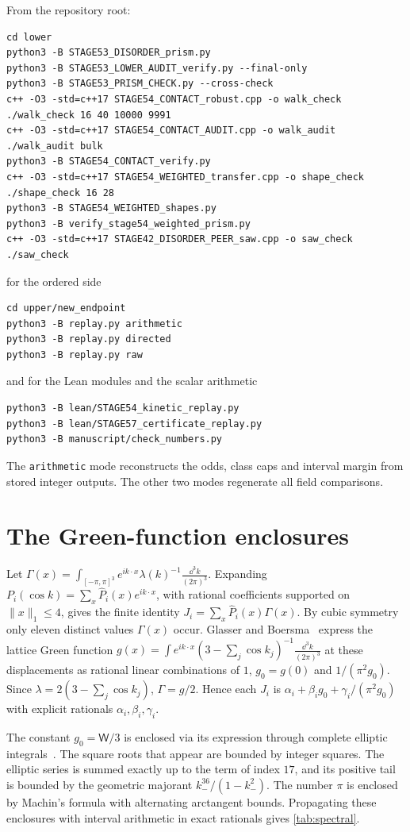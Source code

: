 From the repository root:
\begin{verbatim}
cd lower
python3 -B STAGE53_DISORDER_prism.py
python3 -B STAGE53_LOWER_AUDIT_verify.py --final-only
python3 -B STAGE53_PRISM_CHECK.py --cross-check
c++ -O3 -std=c++17 STAGE54_CONTACT_robust.cpp -o walk_check
./walk_check 16 40 10000 9991
c++ -O3 -std=c++17 STAGE54_CONTACT_AUDIT.cpp -o walk_audit
./walk_audit bulk
python3 -B STAGE54_CONTACT_verify.py
c++ -O3 -std=c++17 STAGE54_WEIGHTED_transfer.cpp -o shape_check
./shape_check 16 28
python3 -B STAGE54_WEIGHTED_shapes.py
python3 -B verify_stage54_weighted_prism.py
c++ -O3 -std=c++17 STAGE42_DISORDER_PEER_saw.cpp -o saw_check
./saw_check
\end{verbatim}
for the ordered side
\begin{verbatim}
cd upper/new_endpoint
python3 -B replay.py arithmetic
python3 -B replay.py directed
python3 -B replay.py raw
\end{verbatim}
and for the Lean modules and the scalar arithmetic
\begin{verbatim}
python3 -B lean/STAGE54_kinetic_replay.py
python3 -B lean/STAGE57_certificate_replay.py
python3 -B manuscript/check_numbers.py
\end{verbatim}
The \texttt{arithmetic} mode reconstructs the odds, class caps and interval margin from stored integer outputs. The other two modes regenerate all field comparisons.

\section{The Green-function enclosures}\label{app:green}

Let $\Gamma(x)=\int_{[-\pi,\pi]^3}e^{ik\cdot x}\lambda(k)^{-1}\frac{\dd^3k}{(2\pi)^3}$. Expanding $P_i(\cos k)=\sum_x\widehat P_i(x)e^{ik\cdot x}$, with rational coefficients supported on $\|x\|_1\le4$, gives the finite identity $J_i=\sum_x\widehat P_i(x)\Gamma(x)$. By cubic symmetry only eleven distinct values $\Gamma(x)$ occur. Glasser and Boersma~\cite[Table~1]{GB00} express the lattice Green function $g(x)=\int e^{ik\cdot x}(3-\sum_j\cos k_j)^{-1}\frac{\dd^3k}{(2\pi)^3}$ at these displacements as rational linear combinations of $1$, $g_0=g(0)$ and $1/(\pi^2g_0)$. Since $\lambda=2(3-\sum_j\cos k_j)$, $\Gamma=g/2$. Hence each $J_i$ is $\alpha_i+\beta_ig_0+\gamma_i/(\pi^2g_0)$ with explicit rationals $\alpha_i,\beta_i,\gamma_i$.

The constant $g_0=\mathsf W/3$ is enclosed via its expression through complete elliptic integrals~\cite{Wat39,GB00}. The square roots that appear are bounded by integer squares. The elliptic series is summed exactly up to the term of index $17$, and its positive tail is bounded by the geometric majorant $k_-^{36}/(1-k_-^2)$. The number $\pi$ is enclosed by Machin's formula with alternating arctangent bounds. Propagating these enclosures with interval arithmetic in exact rationals gives \cref{tab:spectral}.
